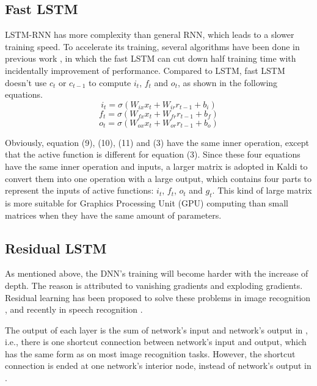 \documentclass[a4paper]{article}
\begin{document}

\subsection{Fast LSTM}

LSTM-RNN has more complexity than general RNN, which leads to a slower training speed.
To accelerate its training, several algorithms have been done in previous work \cite{fast-lstm-1,fast-lstm-2,miao-lstm},
in which the fast LSTM \cite{fast-lstm-1,fast-lstm-2} can cut down half training time with incidentally improvement of performance.
Compared to LSTM, fast LSTM doesn't use $c_t$ or $c_{t-1}$ to compute $i_t$, $f_t$ and $o_t$, as shown in the following equations.
\begin{equation}\label{9}
i_t=\sigma(W_{ix}x_t+W_{ir}r_{t-1}+b_i)
\end{equation}
\begin{equation}\label{10}
f_t=\sigma(W_{fx}x_t+W_{fr}r_{t-1}+b_f)
\end{equation}
\begin{equation}\label{11}
o_t=\sigma(W_{ox}x_t+W_{or}r_{t-1}+b_o)
\end{equation}

Obviously, equation (9), (10), (11) and (3) have the same inner operation, except that the active function is different for equation (3).
Since these four equations have the same inner operation and inputs, a larger matrix is adopted in Kaldi to convert them into one operation with a large output,
which contains four parts to represent the inputs of active functions: $i_t$, $f_t$, $o_t$ and $g_t$.
This kind of large matrix is more suitable for Graphics Processing Unit (GPU) computing than small matrices when they have the same amount of parameters.

\subsection{Residual LSTM}

As mentioned above, the DNN's training will become harder with the increase of depth.
The reason is attributed to vanishing gradients and exploding gradients.
Residual learning has been proposed to solve these problems in image recognition \cite{res-image}, and recently in speech recognition \cite{residual-lstm,res-lstm}.

The output of each layer is the sum of network's input and network's output in \cite{res-lstm}, i.e., there is one shortcut connection between network's input and output,
which has the same form as on most image recognition tasks.
However, the shortcut connection is ended at one network's interior node, instead of network's output in \cite{residual-lstm}.
\end{document}
